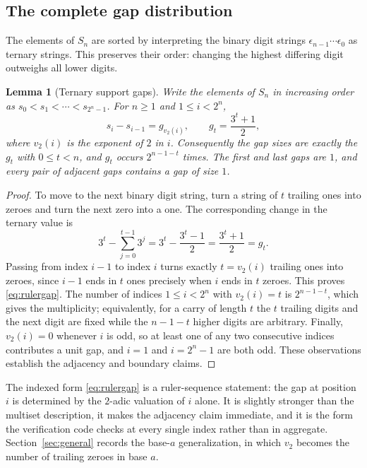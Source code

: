 \documentclass[11pt,letterpaper]{article}
\numberwithin{equation}{section}
\newtheorem{lemma}[theorem]{Lemma}
\theoremstyle{definition}
\theoremstyle{remark}
\begin{document}
\subsection{The complete gap distribution}
The elements of $S_n$ are sorted by interpreting the binary digit strings
$\epsilon_{n-1}\cdots\epsilon_0$ as ternary strings. This preserves their
order: changing the highest differing digit outweighs all lower digits.

\begin{lemma}[Ternary support gaps]\label{lem:ternarygaps}
Write the elements of $S_n$ in increasing order as
$s_0<s_1<\cdots<s_{2^n-1}$. For $n\ge1$ and $1\le i<2^n$,
\begin{equation}\label{eq:rulergap}
 s_i-s_{i-1}=g_{v_2(i)},\qquad
 g_t=\frac{3^t+1}{2},
\end{equation}
where $v_2(i)$ is the exponent of $2$ in $i$. Consequently the gap sizes are
exactly the $g_t$ with $0\le t<n$, and $g_t$ occurs $2^{n-1-t}$ times.
The first and last gaps are $1$, and every pair of adjacent gaps contains a
gap of size $1$.
\end{lemma}
\begin{proof}
To move to the next binary digit string, turn a string of $t$ trailing ones
into zeroes and turn the next zero into a one. The corresponding change in
the ternary value is
\begin{equation}\label{eq:ternarygap}
 3^t-\sum_{j=0}^{t-1}3^j
 =3^t-\frac{3^t-1}{2}=\frac{3^t+1}{2}=g_t.
\end{equation}
Passing from index $i-1$ to index $i$ turns exactly $t=v_2(i)$ trailing ones
into zeroes, since $i-1$ ends in $t$ ones precisely when $i$ ends in $t$
zeroes. This proves \eqref{eq:rulergap}. The number of indices
$1\le i<2^n$ with $v_2(i)=t$ is $2^{n-1-t}$, which gives the multiplicity;
equivalently, for a carry of length $t$ the $t$ trailing digits and the next
digit are fixed while the $n-1-t$ higher digits are arbitrary.
Finally, $v_2(i)=0$ whenever $i$ is odd, so at least one of any two
consecutive indices contributes a unit gap, and $i=1$ and $i=2^n-1$ are both
odd. These observations establish the adjacency and boundary claims.
\end{proof}

The indexed form \eqref{eq:rulergap} is a ruler-sequence statement: the gap
at position $i$ is determined by the $2$-adic valuation of $i$ alone. It is
slightly stronger than the multiset description, it makes the adjacency claim
immediate, and it is the form the verification code checks at every single
index rather than in aggregate. Section~\ref{sec:general} records the
base-$a$ generalization, in which $v_2$ becomes the number of trailing
zeroes in base $a$.
\end{document}
